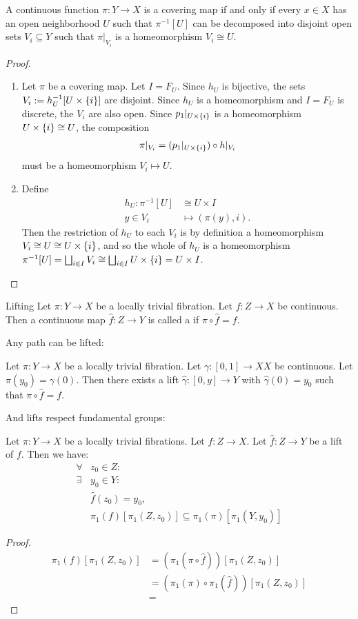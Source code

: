 \begin{theorem}
	A continuous function $\pi : Y \to X$ is a covering map if and only if every $x \in X$ has an open neighborhood $U$ such that $\pi^{-1}[U]$ can be decomposed into disjoint open sets $V_i \subseteq Y$ such that $\pi|_{V_i}$ is a homeomorphism $V_i \cong U$.
\end{theorem}
\begin{proof}
	\begin{enumerate}
		\item[$\Rightarrow$:] Let $\pi$ be a covering map. Let $I = F_U$. Since $h_U$ is bijective, the sets $V_i := h_U^{-1}[U \times \qty{i}]$ are disjoint. Since $h_U$ is a homeomorphism and $I = F_U$ is discrete, the $V_i$ are also open. Since $p_1|_{U \times \qty{i}}$ is a homeomorphism $U \times \qty{i} \cong U$, the composition
		\begin{align*}
			\pi|_{V_i} = (p_1|_{U \times \qty{i}}) \circ h|_{V_i}
		\end{align*}
		must be a homeomorphism $V_i \mapsto U$.
		\item[$\Leftarrow$:] Define 
		\begin{align*}
			h_U : \pi^{-1}[U] &\cong U \times I\\
			y \in V_i &\mapsto (\pi(y),i).
		\end{align*}
		Then the restriction of $h_U$ to each $V_i$ is by definition a homeomorphism $V_i \cong U \cong U \times \qty{i}$, and so the whole of $h_U$ is a homeomorphism $\pi^{-1}[U] = \bigsqcup_{i \in I} V_i \cong \bigsqcup_{i \in I} U \times \qty{i} = U \times I$.
	\end{enumerate}
\end{proof}
\begin{importantdefinition}{Lifting}{}
	Let $\pi : Y \to X$ be a locally trivial fibration. Let $f : Z \to X$ be continuous. Then a continuous map $\hat f : Z \to Y$ is called a  if $\pi \circ \hat f = f$.
\end{importantdefinition}
Any path can be lifted:
\begin{theorem}
Let $\pi : Y \to X$ be a locally trivial fibration. Let $\gamma : [0,1] \to XX$ be continuous. Let $\pi(y_0) = \gamma(0)$. Then there exists a lift $\hat \gamma : [0,y] \to Y$ with $\hat \gamma(0) = y_0$ such that $\pi \circ \hat f = f$.
\end{theorem}
And lifts respect fundamental groups:
\begin{theorem}
	Let $\pi : Y \to X$ be a locally trivial fibrations. Let $f : Z \to X$. Let $\hat f : Z \to Y$ be a lift of $f$. Then we have:
	\begin{align*}
		\forall &z_0 \in Z:\\
		\exists &y_0 \in Y:\\
		&\hat f(z_0) = y_0,\\
		&\pi_1(f)[\pi_1(Z, z_0)] \subseteq \pi_1(\pi)[\pi_1(Y,y_0)]
	\end{align*}
\end{theorem}
\begin{proof}
	\begin{align*}
		\pi_1(f)[\pi_1(Z, z_0)]
		&=
		(\pi_1(\pi \circ \hat f))[\pi_1(Z, z_0)]\\
		&=
		(\pi_1(\pi) \circ \pi_1(\hat f))[\pi_1(Z, z_0)]\\
		&=
	\end{align*}
\end{proof}